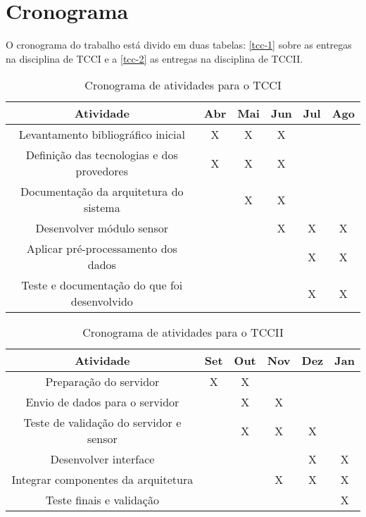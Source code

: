 \chapter{Cronograma}
\label{cronograma}
O cronograma do trabalho está divido em duas tabelas: \autoref{tcc-1} sobre as entregas na disciplina de TCCI
e a \autoref{tcc-2} as entregas na disciplina de TCCII.

\begin{table}[h]
  \begin{center}
  	\caption{\label{tcc-1}Cronograma de atividades para o TCCI}
  	\begin{tabular}{c{4cm} c{2cm} c{2cm} c{2cm} c{2cm} c{2cm}}
      \hline
      Atividade & Abr & Mai & Jun & Jul & Ago \\
      \hline
      \hline
      Levantamento bibliográfico inicial & X & X & X \\
      \hline
      Definição das tecnologias e dos provedores & X & X & X \\
      \hline
      Documentação da arquitetura do sistema & & X & X \\
      \hline
      Desenvolver módulo sensor & & & X & X & X \\
      \hline
      Aplicar pré-processamento dos dados & & & & X & X \\
      \hline
      Teste e documentação do que foi desenvolvido & & & & X & X \\
      \hline
  	\end{tabular}
  \end{center}
\end{table}

\begin{table}[h]
  \begin{center}
  	\caption{\label{tcc-2}Cronograma de atividades para o TCCII}
  	\begin{tabular}{c{5cm} c{2cm} c{2cm} c{2cm} c{2cm} c{2cm}}
      \hline
      Atividade & Set & Out & Nov & Dez & Jan \\
      \hline
      \hline
      Preparação do servidor & X & X \\
      \hline
       Envio de dados para o servidor &  & X & X \\
      \hline
      Teste de validação do servidor e sensor & & X & X & X \\
      \hline
      Desenvolver interface & & & & X & X  \\
      \hline
      Integrar componentes da arquitetura & & & X & X & X \\
      \hline
      Teste finais e validação & & & & & X \\
      \hline
  	\end{tabular}
  \end{center}
\end{table}
